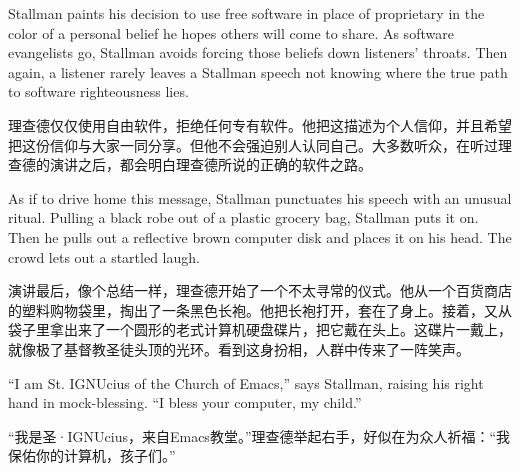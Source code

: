 \ifdefined\eng
Stallman paints his decision to use free software in place of proprietary in the color of a personal belief he hopes others will come to share. As software evangelists go, Stallman avoids forcing those beliefs down listeners' throats. Then again, a listener rarely leaves a Stallman speech not knowing where the true path to software righteousness lies.
\fi

\ifdefined\chs
理查德仅仅使用自由软件，拒绝任何专有软件。他把这描述为个人信仰，并且希望把这份信仰与大家一同分享。但他不会强迫别人认同自己。大多数听众，在听过理查德的演讲之后，都会明白理查德所说的正确的软件之路。
\fi

\ifdefined\eng
As if to drive home this message, Stallman punctuates his speech with an unusual ritual. Pulling a black robe out of a plastic grocery bag, Stallman puts it on.  Then he pulls out a reflective brown computer disk and places it on his head. The crowd lets out a startled laugh.
\fi

\ifdefined\chs
演讲最后，像个总结一样，理查德开始了一个不太寻常的仪式。他从一个百货商店的塑料购物袋里，掏出了一条黑色长袍。他把长袍打开，套在了身上。接着，又从袋子里拿出来了一个圆形的老式计算机硬盘碟片，把它戴在头上。这碟片一戴上，就像极了基督教圣徒头顶的光环。看到这身扮相，人群中传来了一阵笑声。
\fi

\ifdefined\eng
``I am St. IGNUcius of the Church of Emacs,'' says Stallman, raising his right hand in mock-blessing. ``I bless your computer, my child.''
\fi

\ifdefined\chs
“我是圣·IGNUcius，来自Emacs教堂。”理查德举起右手，好似在为众人祈福：“我保佑你的计算机，孩子们。”
\fi

